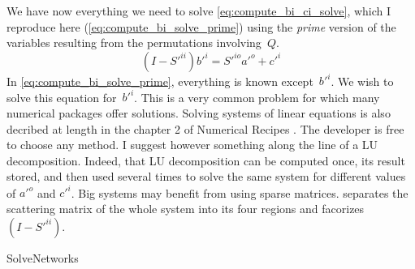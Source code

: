 We have now everything we need to solve \cref{eq:compute_bi_ci_solve}, which I reproduce here (\cref{eq:compute_bi_solve_prime}) using the \textit{prime} version of the variables resulting from the permutations involving~$Q$.
\begin{equation}
    (I - S'^{ii})b'^i = S'^{io}a'^o + c'^i \label{eq:compute_bi_solve_prime}
\end{equation}
In \cref{eq:compute_bi_solve_prime}, everything is known except~$b'^i$.
We wish to solve this equation for~$b'^i$.
This is a very common problem for which many numerical packages offer solutions.
Solving systems of linear equations is also decribed at length in the chapter 2 of Numerical Recipes \cite{Press:2007:NRE:1403886}.
The developer is free to choose any method.
I suggest however something along the line of a LU decomposition.
Indeed, that LU decomposition can be computed once, its result stored, and then used several times to solve the same system for different values of $a'^o$ and $c'^i$.
Big systems may benefit from using sparse matrices.
 separates the scattering matrix of the whole system into its four regions and facorizes $(I - S'^{ii})$.
\begin{algorithm}
    \caption{SolveNetworks}
    \label{algo:solve_networks}
    \begin{algorithmic}
         
         
         
         
         
         
        \State{}
        \State{} 
        \\ 
        \EndFunction
    \end{algorithmic}
\end{algorithm}

